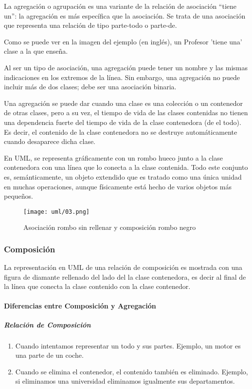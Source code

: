 La agregación o agrupación es una variante de la relación de asociación “tiene un”: la agregación es más específica que la asociación. Se trata de una asociación que representa una relación de tipo parte-todo o parte-de.


Como se puede ver en la imagen del ejemplo (en inglés), un Profesor 'tiene una' clase a la que enseña.


Al ser un tipo de asociación, una agregación puede tener un nombre y las mismas indicaciones en los extremos de la línea. Sin embargo, una agregación no puede incluir más de dos clases; debe ser una asociación binaria.


Una agregación se puede dar cuando una clase es una colección o un contenedor de otras clases, pero a su vez, el tiempo de vida de las clases contenidas no tienen una dependencia fuerte del tiempo de vida de la clase contenedora (de el todo). Es decir, el contenido de la clase contenedora no se destruye automáticamente cuando desaparece dicha clase.


En UML, se representa gráficamente con un rombo hueco junto a la clase contenedora con una línea que lo conecta a la clase contenida. Todo este conjunto es, semánticamente, un objeto extendido que es tratado como una única unidad en muchas operaciones, aunque físicamente está hecho de varios objetos más pequeños.

\begin{figure}[h!t] 
    \centering
    \texttt{[image: uml/03.png]}
    \caption{Asociación rombo sin rellenar y composición rombo negro}
    \label{img:uml-composicion}
\end{figure}

\subsubsection*{Composición}

La representación en UML de una relación de composición es mostrada con una figura de diamante rellenado del lado del la clase contenedora, es decir al final de la línea que conecta la clase contenido con la clase contenedor.


\paragraph*{Diferencias entre Composición y Agregación}

\subparagraph*{Relación de Composición}

\begin{enumerate}
    \item Cuando intentamos representar un todo y sus partes. Ejemplo, un motor es una parte de un coche.
    \item Cuando se elimina el contenedor, el contenido también es eliminado. Ejemplo, si eliminamos una universidad eliminamos igualmente sus departamentos.
\end{enumerate}


